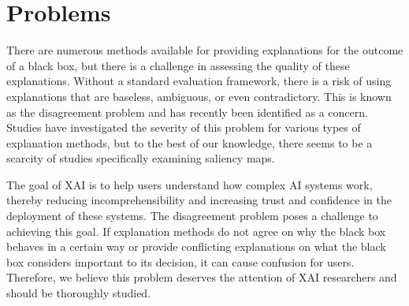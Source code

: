 \section{Problems}
\label{sec:problem} 
There are numerous methods available for providing explanations for the outcome of a black box, but there is a challenge in assessing the quality of these explanations. Without a standard evaluation framework, there is a risk of using explanations that are baseless, ambiguous, or even contradictory. This is known as the disagreement problem and has recently been identified as a concern. Studies have investigated the severity of this problem for various types of explanation methods, but to the best of our knowledge, there seems to be a scarcity of studies specifically examining saliency maps.

The goal of XAI is to help users understand how complex AI systems work, thereby reducing incomprehensibility and increasing trust and confidence in the deployment of these systems. The disagreement problem poses a challenge to achieving this goal. If explanation methods do not agree on why the black box behaves in a certain way or provide conflicting explanations on what the black box considers important to its decision, it can cause confusion for users. Therefore, we believe this problem deserves the attention of XAI researchers and should be thoroughly studied.

